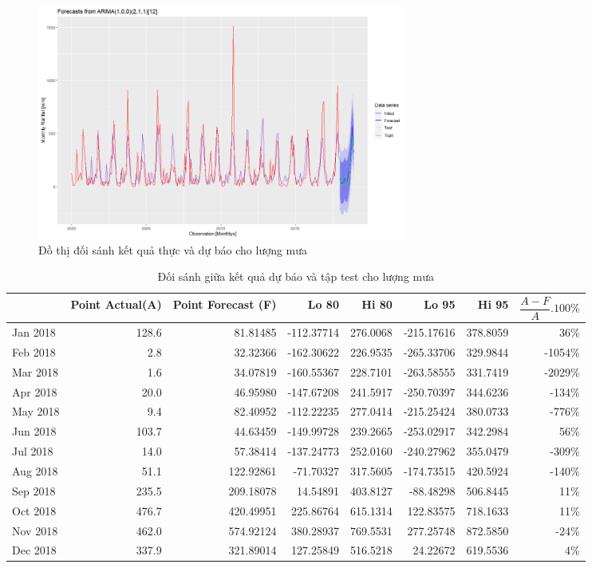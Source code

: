 \documentclass[12pt, a4paper,oneside]{book}
\theoremstyle{definition}
\begin{document}
\begin{figure}[!htb]
	\centering
	\includegraphics[width=1\linewidth,height=7.7cm]{anh/V8}
	\vskip-4mm 
	\caption{Đồ thị đối sánh kết quả thực và dự báo cho lượng mưa}  
	\label{V8}
\end{figure}
\begin{table}[!h]	
	\caption{Đối sánh giữa kết quả dự báo và tập test cho lượng mưa}
	\label{test_fc}
	\centering
	\fontsize{6}{8}\selectfont
	\begin{tabular}[t]{lrrrrrrr}
		\toprule
		&Point Actual(A) & Point Forecast (F)& Lo 80 & Hi 80 & Lo 95 & Hi 95& $\dfrac{A-F}{A}.100\%$\\
		\midrule
		\rowcolor{gray!6}  Jan 2018 & 128.6 & 81.81485 & -112.37714 & 276.0068 & -215.17616 & 378.8059 & 36\%\\
		Feb 2018 & 2.8 & 32.32366 & -162.30622 & 226.9535 & -265.33706 & 329.9844 & -1054\%\\
		\rowcolor{gray!6}  Mar 2018 & 1.6 & 34.07819 & -160.55367 & 228.7101 & -263.58555 & 331.7419 & -2029\%\\
		Apr 2018 & 20.0 & 46.95980 & -147.67208 & 241.5917 & -250.70397 & 344.6236 & -134\%\\
		\rowcolor{gray!6}  May 2018 & 9.4 & 82.40952 & -112.22235 & 277.0414 & -215.25424 & 380.0733 & -776\%\\
		\addlinespace
		Jun 2018 & 103.7 & 44.63459 & -149.99728 & 239.2665 & -253.02917 & 342.2984 & 56\%\\
		\rowcolor{gray!6}  Jul 2018 & 14.0 & 57.38414 & -137.24773 & 252.0160 & -240.27962 & 355.0479 & -309\%\\
		Aug 2018 & 51.1 & 122.92861 & -71.70327 & 317.5605 & -174.73515 & 420.5924 & -140\%\\
		\rowcolor{gray!6}  Sep 2018 & 235.5 & 209.18078 & 14.54891 & 403.8127 & -88.48298 & 506.8445 & 11\%\\
		Oct 2018 & 476.7 & 420.49951 & 225.86764 & 615.1314 & 122.83575 & 718.1633 & 11\%\\
		\addlinespace
		\rowcolor{gray!6}  Nov 2018 & 462.0 & 574.92124 & 380.28937 & 769.5531 & 277.25748 & 872.5850 & -24\%\\
		Dec 2018 & 337.9 & 321.89014 & 127.25849 & 516.5218 & 24.22672 & 619.5536 & 4\%\\
		\bottomrule
	\end{tabular}
\end{table}
\end{document}

